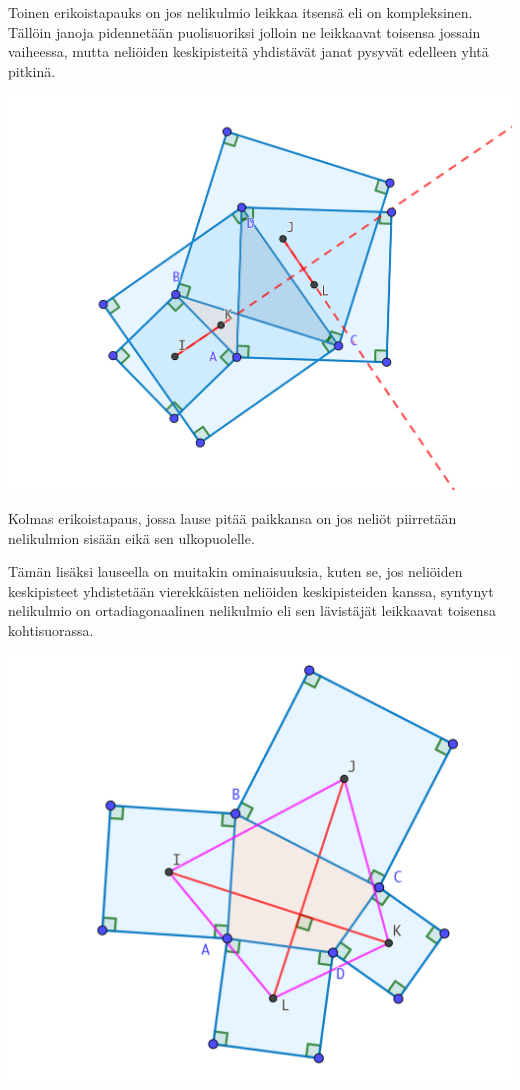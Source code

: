 \documentclass{scrartcl}
\begin{document}
Toinen erikoistapauks on jos nelikulmio leikkaa itsensä eli on kompleksinen. Tällöin janoja pidennetään puolisuoriksi jolloin ne leikkaavat toisensa jossain vaiheessa, mutta neliöiden keskipisteitä yhdistävät janat pysyvät edelleen yhtä pitkinä.
\begin{center}
    \includegraphics[scale=0.15]{konveksi.png}
\end{center}

Kolmas erikoistapaus, jossa lause pitää paikkansa on jos neliöt piirretään nelikulmion sisään eikä sen ulkopuolelle. 

Tämän lisäksi lauseella on muitakin ominaisuuksia, kuten se, jos neliöiden keskipisteet yhdistetään vierekkäisten neliöiden keskipisteiden kanssa, syntynyt nelikulmio on ortadiagonaalinen nelikulmio eli sen lävistäjät leikkaavat toisensa kohtisuorassa.
\begin{center}
    \includegraphics[scale=0.3]{ortadiagonaali.png}
\end{center}
\end{document}
